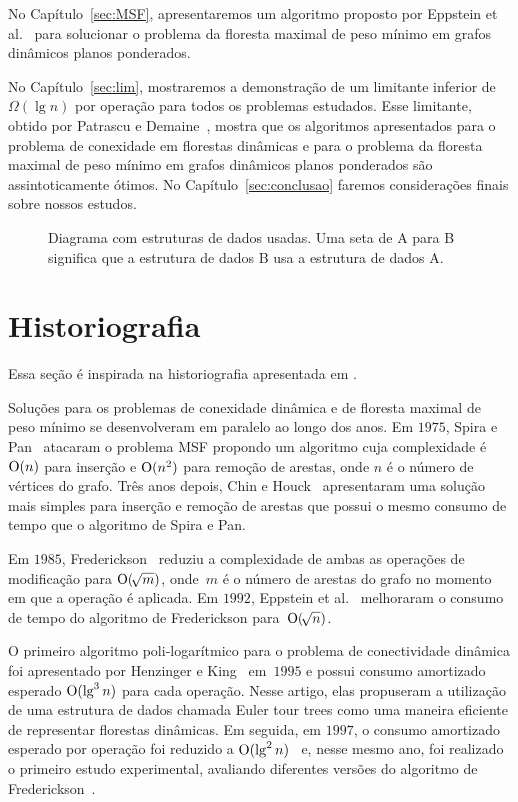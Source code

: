 No Capítulo~\ref{sec:MSF}, apresentaremos um algoritmo proposto por Eppstein et al.~\cite{EPPSTEIN-planar} para solucionar o problema da floresta maximal de peso mínimo em grafos dinâmicos planos ponderados.

No Capítulo~\ref{sec:lim}, mostraremos a demonstração de um limitante inferior de~$\Omega(\lg n)$ por operação para todos os problemas estudados.
Esse limitante, obtido por Patrascu e Demaine~\cite{lowerBoundPatrascu}, mostra que os algoritmos apresentados para o problema de conexidade em florestas dinâmicas e para o problema da floresta maximal de peso mínimo em grafos dinâmicos planos ponderados são assintoticamente ótimos.
No Capítulo~\ref{sec:conclusao} faremos considerações finais sobre nossos estudos.


\begin{figure}[htb]
\centering

\caption{Diagrama com estruturas de dados usadas. Uma seta de A para B significa que a estrutura de dados B usa a estrutura de dados A.}
\label{fig:roadmap}
\end{figure}

\section{Historiografia}

Essa seção é inspirada na historiografia apresentada em \cite{HHSRecentAdvances2022, Zaroliagis2002}.

Soluções para os problemas de conexidade dinâmica e de floresta maximal de peso mínimo se desenvolveram em paralelo ao longo dos anos. Em $1975$, Spira e Pan~\cite{SP1975} atacaram o problema MSF propondo um algoritmo cuja complexidade é $\mathrm{O}(n)$ para inserção e $\mathrm{O}(n^2)$ para remoção de arestas, onde $n$ é o número de vértices do grafo. Três anos depois, Chin e Houck~\cite{CH1978} apresentaram uma solução mais simples para inserção e remoção de arestas que possui o mesmo consumo de tempo que o algoritmo de Spira e Pan.

Em $1985$, Frederickson~\cite{frederickson1983data} reduziu a complexidade de ambas as operações de modificação para $\mathrm{O}(\!\sqrt{m})$, onde~$m$ é o número de arestas do grafo no momento em que a operação é aplicada.
Em $1992$, Eppstein et al.~\cite{Eppstein1992SparsificationaTF,Eppstein1997SparsificationaTF} melhoraram o consumo de tempo do algoritmo de Frederickson para~$\mathrm{O}(\!\sqrt{n})$.

O primeiro algoritmo poli-logarítmico para o problema de conectividade dinâmica foi apresentado por Henzinger e King~\cite{HenzingerKing} em~$1995$ e possui consumo amortizado esperado $\mathrm{O}(\lg^3 n)$ para cada operação. Nesse artigo, elas propuseram a utilização de uma estrutura de dados chamada Euler tour trees como uma maneira eficiente de representar florestas dinâmicas.
Em seguida, em $1997$, o consumo amortizado esperado por operação foi reduzido a $\mathrm{O}(\lg^2 n)$~\cite{HenzingerThorup} e, nesse mesmo ano, foi realizado o primeiro estudo experimental, avaliando diferentes versões do algoritmo de Frederickson~\cite{xpAnalyGiuseppe}.

